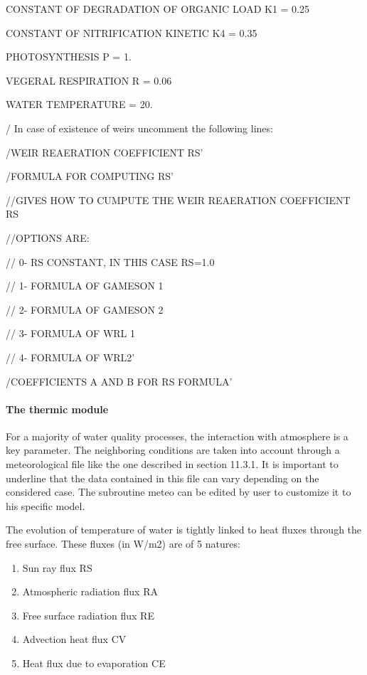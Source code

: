\documentclass{article} %
\begin{document}
 CONSTANT OF DEGRADATION OF ORGANIC LOAD K1 = 0.25

 CONSTANT OF NITRIFICATION KINETIC K4                     = 0.35

 PHOTOSYNTHESIS P                                                          = 1.

 VEGERAL RESPIRATION R                                                 = 0.06

 WATER TEMPERATURE                                                      = 20.

 / In case of existence of weirs uncomment the following lines:

 /WEIR REAERATION COEFFICIENT RS'

 /FORMULA FOR COMPUTING RS'

 //GIVES HOW TO CUMPUTE THE WEIR REAERATION COEFFICIENT RS

 //OPTIONS ARE:

 //  0- RS CONSTANT, IN THIS CASE RS=1.0

 //  1- FORMULA OF GAMESON 1

 //  2- FORMULA OF GAMESON 2

 //  3- FORMULA OF WRL 1

 //  4- FORMULA OF WRL2'

 /COEFFICIENTS A AND B FOR RS FORMULA'


\paragraph{ The thermic module}



 For a majority of water quality processes, the interaction with atmosphere is a key parameter. The neighboring conditions are taken into account through a meteorological file like the one described in section 11.3.1. It is important to underline that the data contained in this file can vary depending on the considered case. The subroutine meteo can be edited by user to customize it to his specific model.

 The evolution of temperature of water is tightly linked to heat fluxes through the free surface. These fluxes (in W/m2) are of 5 natures:

\begin{enumerate}
\item  Sun ray flux RS

\item  Atmospheric radiation flux RA

\item  Free surface radiation flux RE

\item  Advection heat flux CV

\item  Heat flux due to evaporation CE
\end{enumerate}
\end{document}
